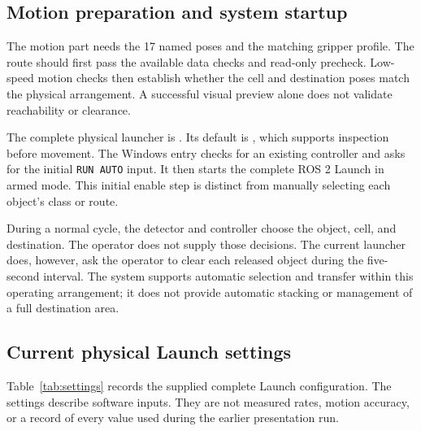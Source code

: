 \subsection{Motion preparation and system startup}
The motion part needs the 17 named poses and the matching gripper profile. The route should first pass the available data checks and read-only precheck. Low-speed motion checks then establish whether the cell and destination poses match the physical arrangement. A successful visual preview alone does not validate reachability or clearance.

The complete physical launcher is . Its default is , which supports inspection before movement. The Windows  entry checks for an existing controller and asks for the initial \texttt{RUN AUTO} input. It then starts the complete ROS 2 Launch in armed mode. This initial enable step is distinct from manually selecting each object's class or route.

During a normal cycle, the detector and controller choose the object, cell, and destination. The operator does not supply those decisions. The current launcher does, however, ask the operator to clear each released object during the five-second interval. The system supports automatic selection and transfer within this operating arrangement; it does not provide automatic stacking or management of a full destination area.

\subsection{Current physical Launch settings}
Table~\ref{tab:settings} records the supplied complete Launch configuration. The settings describe software inputs. They are not measured rates, motion accuracy, or a record of every value used during the earlier presentation run.

